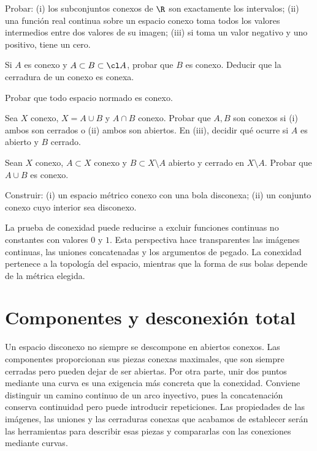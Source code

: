 \begin{ejercicio}\label{ej:lectura-17-2}
Probar: (i) los subconjuntos conexos de $\R$ son exactamente los intervalos; (ii) una función real continua sobre un espacio conexo toma todos los valores intermedios entre dos valores de su imagen; (iii) si toma un valor negativo y uno positivo, tiene un cero.
\end{ejercicio}


\begin{ejercicio}\label{ej:lectura-17-3}
Si $A$ es conexo y $A\subset B\subset\cl A$, probar que $B$ es conexo. Deducir que la cerradura de un conexo es conexa.
\end{ejercicio}


\begin{ejercicio}\label{ej:lectura-17-4}
Probar que todo espacio normado es conexo.
\end{ejercicio}


\begin{ejercicio}\label{ej:lectura-17-5}
Sea $X$ conexo, $X=A\cup B$ y $A\cap B$ conexo. Probar que $A,B$ son conexos si (i) ambos son cerrados o (ii) ambos son abiertos. En (iii), decidir qué ocurre si $A$ es abierto y $B$ cerrado.
\end{ejercicio}


\begin{ejercicio}\label{ej:lectura-17-6}\label{ch17:ex6}
Sean $X$ conexo, $A\subset X$ conexo y $B\subset X\setminus A$ abierto y cerrado en $X\setminus A$. Probar que $A\cup B$ es conexo.
\end{ejercicio}


\begin{ejercicio}\label{ej:lectura-17-7}
Construir: (i) un espacio métrico conexo con una bola disconexa; (ii) un conjunto conexo cuyo interior sea disconexo.
\end{ejercicio}


La prueba de conexidad puede reducirse a excluir funciones continuas no constantes con valores $0$ y $1$. Esta perspectiva hace transparentes las imágenes continuas, las uniones concatenadas y los argumentos de pegado. La conexidad pertenece a la topología del espacio, mientras que la forma de sus bolas depende de la métrica elegida.

\section{Componentes y desconexión total}\label{lectura:18}
Un espacio disconexo no siempre se descompone en abiertos conexos. Las componentes proporcionan sus piezas conexas maximales, que son siempre cerradas pero pueden dejar de ser abiertas. Por otra parte, unir dos puntos mediante una curva es una exigencia más concreta que la conexidad. Conviene distinguir un camino continuo de un arco inyectivo, pues la concatenación conserva continuidad pero puede introducir repeticiones. Las propiedades de las imágenes, las uniones y las cerraduras conexas que acabamos de establecer serán las herramientas para describir esas piezas y compararlas con las conexiones mediante curvas.

